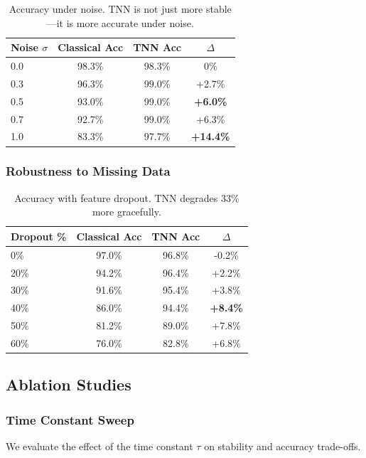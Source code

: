 \documentclass[11pt]{article}
\begin{document}
\begin{table}[h]
\centering
\begin{tabular}{lccc}
\toprule
Noise $\sigma$ & Classical Acc & TNN Acc & $\Delta$ \\
\midrule
0.0 & 98.3\% & 98.3\% & 0\% \\
0.3 & 96.3\% & 99.0\% & +2.7\% \\
0.5 & 93.0\% & 99.0\% & \textbf{+6.0\%} \\
0.7 & 92.7\% & 99.0\% & +6.3\% \\
1.0 & 83.3\% & 97.7\% & \textbf{+14.4\%} \\
\bottomrule
\end{tabular}
\caption{Accuracy under noise. TNN is not just more stable---it is more accurate under noise.}
\label{tab:noise_acc}
\end{table}

\subsubsection{Robustness to Missing Data}

\begin{table}[h]
\centering
\begin{tabular}{lccc}
\toprule
Dropout \% & Classical Acc & TNN Acc & $\Delta$ \\
\midrule
0\% & 97.0\% & 96.8\% & -0.2\% \\
20\% & 94.2\% & 96.4\% & +2.2\% \\
30\% & 91.6\% & 95.4\% & +3.8\% \\
40\% & 86.0\% & 94.4\% & \textbf{+8.4\%} \\
50\% & 81.2\% & 89.0\% & +7.8\% \\
60\% & 76.0\% & 82.8\% & +6.8\% \\
\bottomrule
\end{tabular}
\caption{Accuracy with feature dropout. TNN degrades 33\% more gracefully.}
\label{tab:dropout}
\end{table}

\subsection{Ablation Studies}

\subsubsection{Time Constant Sweep}

We evaluate the effect of the time constant $\tau$ on stability and accuracy trade-offs.
\end{document}
